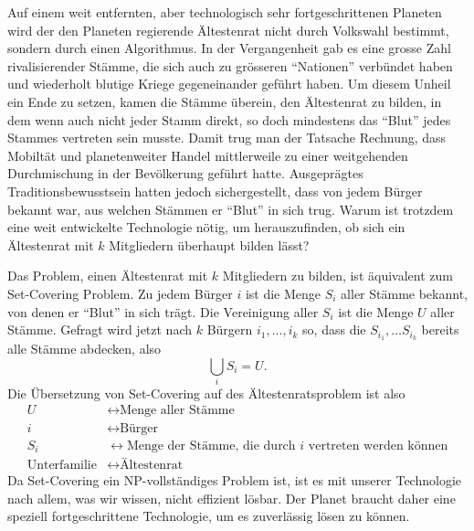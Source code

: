 Auf einem weit entfernten, aber technologisch sehr fortgeschrittenen
Planeten wird der den Planeten regierende Ältestenrat
nicht durch Volkswahl bestimmt, sondern durch einen Algorithmus.
In der Vergangenheit gab es eine grosse Zahl rivalisierender
Stämme, die sich auch zu grösseren ``Nationen'' verbündet haben
und wiederholt blutige Kriege gegeneinander geführt haben.
Um diesem Unheil ein Ende zu setzen, kamen die Stämme überein,
den Ältestenrat zu bilden, in dem wenn auch nicht jeder Stamm direkt,
so doch mindestens das ``Blut'' jedes Stammes vertreten sein musste.
Damit trug man der Tatsache Rechnung, dass Mobiltät und planetenweiter
Handel mittlerweile zu einer weitgehenden Durchmischung in der
Bevölkerung geführt hatte. Ausgeprägtes Traditionsbewusstsein hatten
jedoch sichergestellt, dass von jedem Bürger bekannt war, aus welchen
Stämmen er ``Blut'' in sich trug. Warum ist trotzdem eine weit entwickelte
Technologie nötig, um herauszufinden, ob sich ein Ältestenrat
mit $k$ Mitgliedern überhaupt bilden lässt?


\begin{loesung}
Das Problem, einen Ältestenrat mit $k$  Mitgliedern zu bilden, ist
äquivalent zum Set-Covering Problem. Zu jedem Bürger $i$
ist die Menge $S_i$ aller Stämme bekannt, von denen er ``Blut''
in sich trägt. Die Vereinigung aller $S_i$ ist die Menge $U$ aller
Stämme. Gefragt wird jetzt nach $k$ Bürgern $i_1,\dots,i_k$ so,
dass die $S_{i_1},\dots S_{i_k}$ bereits alle Stämme abdecken, also
\[
\bigcup_i S_i=U.
\]
Die Übersetzung von Set-Covering auf des Ältestenratsproblem ist also
\begin{align*}
U&\leftrightarrow\text{Menge aller Stämme}\\
i&\leftrightarrow\text{Bürger}\\
S_i&\leftrightarrow\text{Menge der Stämme, die durch $i$ vertreten werden können}\\
\text{Unterfamilie}&\leftrightarrow\text{Ältestenrat}
\end{align*}
Da Set-Covering ein NP-vollständiges Problem ist, ist es mit unserer
Technologie nach allem, was wir wissen, nicht effizient lösbar. Der
Planet braucht daher eine speziell fortgeschrittene Technologie, um es
zuverlässig lösen zu können.
\end{loesung}
